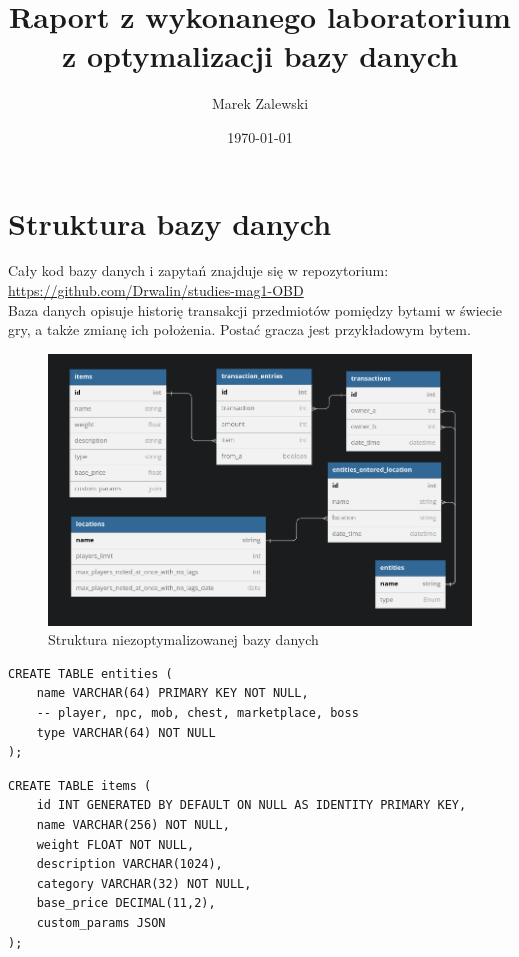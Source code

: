 \documentclass[11pt]{article}
\author{Marek Zalewski
}
\date{\today}
\title{%
	Raport z wykonanego laboratorium z optymalizacji bazy danych
}
\numberwithin{figure}{subsection}
\begin{document}
\maketitle
\tableofcontents

\newpage

\section{Struktura bazy danych}
	Cały kod bazy danych i zapytań znajduje się w repozytorium:
	\url{https://github.com/Drwalin/studies-mag1-OBD}
	\\
	Baza danych opisuje historię transakcji przedmiotów pomiędzy bytami w
	świecie gry, a także zmianę ich położenia. Postać gracza jest przykładowym
	bytem.
	\begin{figure}[H]
		\centering
		\includegraphics[width=1.0\textwidth]{./images/struktura-bazy-danych.png}
		\caption[Schemat filtra]{Struktura niezoptymalizowanej bazy danych}
		\label{fig:schemat_filtra}
	\end{figure}
	
	\begin{lstlisting}[caption={Kod utworzenia tabeli entities},captionpos=b]
CREATE TABLE entities (
	name VARCHAR(64) PRIMARY KEY NOT NULL,
	-- player, npc, mob, chest, marketplace, boss
	type VARCHAR(64) NOT NULL
);
    \end{lstlisting}

	\begin{lstlisting}[caption={Kod utworzenia tabeli items},captionpos=b]
CREATE TABLE items (
	id INT GENERATED BY DEFAULT ON NULL AS IDENTITY PRIMARY KEY,
	name VARCHAR(256) NOT NULL,
	weight FLOAT NOT NULL,
	description VARCHAR(1024),
	category VARCHAR(32) NOT NULL,
	base_price DECIMAL(11,2),
	custom_params JSON
);
    \end{lstlisting}
\end{document}
